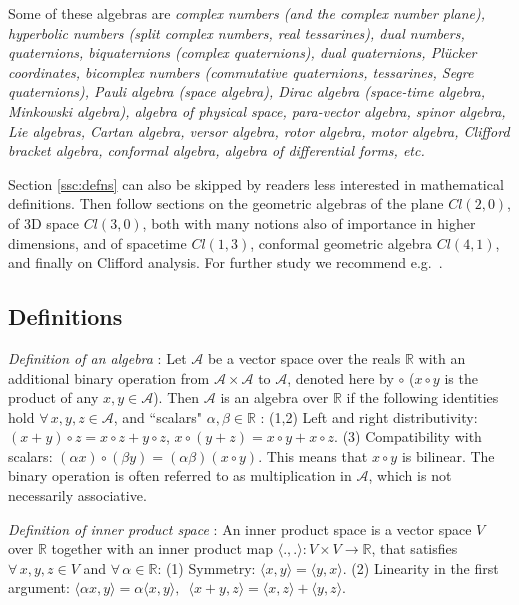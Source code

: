 \documentclass[cameraready]{jcmsi}%
\newcommand{\R}{\mathbb{R}}
\begin{document}
Some of these algebras are \textit{complex numbers (and the complex number plane), hyperbolic numbers (split complex numbers, real tessarines), dual numbers, quaternions, biquaternions (complex quaternions), dual quaternions, Pl\"{u}cker coordinates, bicomplex numbers (commutative quaternions, tessarines, Segre quaternions), Pauli algebra (space algebra), Dirac algebra (space-time algebra, Minkowski algebra), algebra of physical space, para-vector algebra, spinor algebra, Lie algebras, Cartan algebra, versor algebra, rotor algebra, motor algebra, Clifford bracket algebra, conformal algebra, algebra of differential forms, etc.}

Section \ref{ssc:defns} can also be skipped by readers less interested in mathematical definitions. Then follow sections on the geometric algebras of the plane $Cl(2,0)$, of 3D space $Cl(3,0)$, both with many notions also of importance in higher dimensions, and of spacetime $Cl(1,3)$, conformal geometric algebra $Cl(4,1)$, and finally on Clifford analysis. For further study we recommend e.g.~\cite{DFM:GAfCS}. 

\subsection{Definitions \label{ssc:defns}}

\textit{Definition of an algebra} \cite{Wiki:AoF}:
Let $\mathcal{A}$ be a vector space over the reals $\R$ with an additional binary operation from $\mathcal{A} \times \mathcal{A}$ to $\mathcal{A}$, denoted here by $\circ$ ($x \circ y$ is the product of any $x,y \in \mathcal{A}$). Then $\mathcal{A}$ is an algebra over $\R$ if the following identities hold $\forall \, x,y,z \in \mathcal{A}$, and ``scalars" $\alpha, \beta \in \R$ :
(1,2) Left and right distributivity: 
    $(x + y) \circ z = x \circ z + y \circ z$,
    $x \circ (y + z) = x \circ y + x \circ z$.
(3) Compatibility with scalars: 
    $(\alpha x) \circ (\beta y) = (\alpha\beta)(x \circ y)$.
This means that $x \circ y$ is bilinear. The binary operation is often referred to as multiplication in $\mathcal{A}$, which is not necessarily associative.

\textit{Definition of inner product space} \cite{Wiki:IP}:
An inner product space is a vector space $V$ over $\R$ together with an inner product map
$\langle . , . \rangle : V \times V \rightarrow \R$,
that satisfies $\forall \, x,y,z \in V$ and $\forall \, \alpha \in \R$:
(1) Symmetry:
    $\langle x,y \rangle = \langle y,x \rangle $.
(2) Linearity in the first argument:
    $\langle \alpha x,y\rangle= \alpha \langle x,y\rangle, \,\,\,
        \langle x+y,z\rangle= \langle x,z\rangle+ \langle y,z\rangle.$
\end{document}
